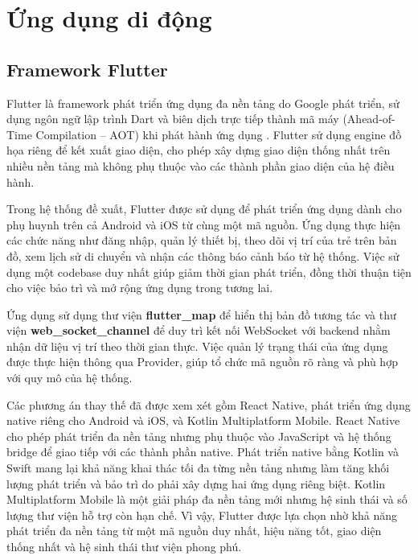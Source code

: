 \documentclass[../DoAn.tex]{subfiles}
\begin{document}
\section{Ứng dụng di động}
\label{section:3.4}

\subsection{Framework Flutter}
\label{subsection:3.4.1}

Flutter là framework phát triển ứng dụng đa nền tảng do Google phát triển, sử dụng ngôn ngữ lập trình Dart và biên dịch trực tiếp thành mã máy (Ahead-of-Time Compilation – AOT) khi phát hành ứng dụng \cite{flutter_docs}. Flutter sử dụng engine đồ họa riêng để kết xuất giao diện, cho phép xây dựng giao diện thống nhất trên nhiều nền tảng mà không phụ thuộc vào các thành phần giao diện của hệ điều hành.

Trong hệ thống đề xuất, Flutter được sử dụng để phát triển ứng dụng dành cho phụ huynh trên cả Android và iOS từ cùng một mã nguồn. Ứng dụng thực hiện các chức năng như đăng nhập, quản lý thiết bị, theo dõi vị trí của trẻ trên bản đồ, xem lịch sử di chuyển và nhận các thông báo cảnh báo từ hệ thống. Việc sử dụng một codebase duy nhất giúp giảm thời gian phát triển, đồng thời thuận tiện cho việc bảo trì và mở rộng ứng dụng trong tương lai.

Ứng dụng sử dụng thư viện \textbf{flutter\_map} \cite{flutter_map_pkg} để hiển thị bản đồ tương tác và thư viện \textbf{web\_socket\_channel} để duy trì kết nối WebSocket với backend nhằm nhận dữ liệu vị trí theo thời gian thực. Việc quản lý trạng thái của ứng dụng được thực hiện thông qua Provider, giúp tổ chức mã nguồn rõ ràng và phù hợp với quy mô của hệ thống.

Các phương án thay thế đã được xem xét gồm React Native, phát triển ứng dụng native riêng cho Android và iOS, và Kotlin Multiplatform Mobile. React Native cho phép phát triển đa nền tảng nhưng phụ thuộc vào JavaScript và hệ thống bridge để giao tiếp với các thành phần native. Phát triển native bằng Kotlin và Swift mang lại khả năng khai thác tối đa từng nền tảng nhưng làm tăng khối lượng phát triển và bảo trì do phải xây dựng hai ứng dụng riêng biệt. Kotlin Multiplatform Mobile là một giải pháp đa nền tảng mới nhưng hệ sinh thái và số lượng thư viện hỗ trợ còn hạn chế. Vì vậy, Flutter được lựa chọn nhờ khả năng phát triển đa nền tảng từ một mã nguồn duy nhất, hiệu năng tốt, giao diện thống nhất và hệ sinh thái thư viện phong phú.
\end{document}
